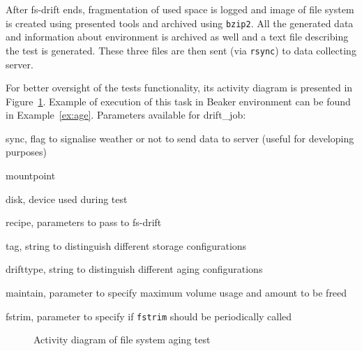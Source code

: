 \documentclass[
  color, %
  table, %
  lof,   %
  lot,   %
]{fithesis3}
\begin{document}
After fs-drift ends, fragmentation of used space is logged and image of file system is created using presented tools and archived using \texttt{bzip2}. All the generated data and information about environment is archived as well and a text file describing the test is generated. These three files are then sent (via \texttt{rsync}) to data collecting server.

For better oversight of the tests functionality, its activity diagram is presented in Figure~\ref{fig:drift_job_activity}. Example of execution of this task in Beaker environment can be found in Example~\ref{ex:age}. 
\clearpage
Parameters available for drift\_job:
\begin{compactenum}
  \item sync, flag to signalise weather or not to send data to server (useful for developing purposes)
  \item mountpoint
  \item disk, device used during test
  \item recipe, parameters to pass to fs-drift
  \item tag, string to distinguish different storage configurations
  \item drifttype, string to distinguish different aging configurations
  \item maintain, parameter to specify maximum volume usage and amount to be freed
  \item fstrim, parameter to specify if \texttt{fstrim} should be periodically called
  \end{compactenum}


\begin{figure}[ht]
    \centering
    \caption{Activity diagram of file system aging test}
    \label{fig:drift_job_activity}
\end{figure}
\end{document}
